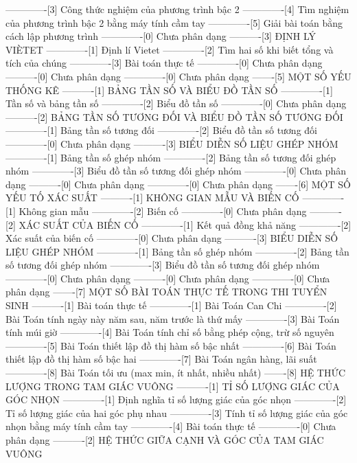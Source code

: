 -------------[3] Công thức nghiệm của phương trình bậc 2
-------------[4] Tìm nghiệm của phương trình bậc 2 bằng máy tính cầm tay
-------------[5] Giải bài toán bằng cách lập phương trình
-------------[0] Chưa phân dạng
----------[3] ĐỊNH LÝ VIÈTET
-------------[1] Định lí Vietet
-------------[2] Tìm hai số khi biết tổng và tích của chúng
-------------[3] Bài toán thực tế
-------------[0] Chưa phân dạng
----------[0] Chưa phân dạng
-------------[0] Chưa phân dạng
-------[5] MỘT SỐ YẾU THỐNG KÊ
----------[1] BẢNG TẦN SỐ VÀ BIỂU ĐỒ TẦN SỐ
-------------[1] Tần số và bảng tần số
-------------[2] Biểu đồ tần số
-------------[0] Chưa phân dạng
----------[2] BẢNG TẦN SỐ TƯƠNG ĐỐI VÀ BIỂU ĐỒ TẦN SỐ TƯƠNG ĐỐI
-------------[1] Bảng tần số tương đối
-------------[2] Biểu đồ tần số tương đối
-------------[0] Chưa phân dạng
----------[3] BIỂU DIỄN SỐ LIỆU GHÉP NHÓM
-------------[1] Bảng tần số ghép nhóm
-------------[2] Bảng tần số tương đối ghép nhóm
-------------[3] Biểu đồ tần số tương đối ghép nhóm
-------------[0] Chưa phân dạng
----------[0] Chưa phân dạng
-------------[0] Chưa phân dạng
-------[6] MỘT SỐ YẾU TỐ XÁC SUẤT
----------[1] KHÔNG GIAN MẪU VÀ BIẾN CỐ
-------------[1] Không gian mẫu
-------------[2] Biến cố
-------------[0] Chưa phân dạng
----------[2] XÁC SUẤT CỦA BIẾN CỐ
-------------[1] Kết quả đồng khả năng
-------------[2] Xác suất của biến cố
-------------[0] Chưa phân dạng
----------[3] BIỂU DIỄN SỐ LIỆU GHÉP NHÓM
-------------[1] Bảng tần số ghép nhóm
-------------[2] Bảng tần số tương đối ghép nhóm
-------------[3] Biểu đồ tần số tương đối ghép nhóm
-------------[0] Chưa phân dạng
----------[0] Chưa phân dạng
-------------[0] Chưa phân dạng
-------[7] MỘT SỐ BÀI TOÁN THỰC TẾ TRONG THI TUYỂN SINH
----------[1] Bài toán thực tế
-------------[1] Bài Toán Can Chi
-------------[2] Bài Toán tính ngày này năm sau, năm trước là thứ mấy
-------------[3] Bài Toán tính múi giờ
-------------[4] Bài Toán tính chỉ số bằng phép cộng, trừ số nguyên
-------------[5] Bài Toán thiết lập đồ thị hàm số bậc nhất
-------------[6] Bài Toán thiết lập đồ thị hàm số bậc hai
-------------[7] Bài Toán ngân hàng, lãi suất
-------------[8] Bài Toán tối ưu (max min, ít nhất, nhiều nhất)
-------[8] HỆ THỨC LƯỢNG TRONG TAM GIÁC VUÔNG
----------[1] TỈ SỐ LƯỢNG GIÁC CỦA GÓC NHỌN
-------------[1] Định nghĩa tỉ số lượng giác của góc nhọn
-------------[2] Tỉ số lượng giác của hai góc phụ nhau
-------------[3] Tính tỉ số lượng giác của góc nhọn bằng máy tính cầm tay
-------------[4] Bài toán thực tế
-------------[0] Chưa phân dạng
----------[2] HỆ THỨC GIỮA CẠNH VÀ GÓC CỦA TAM GIÁC VUÔNG
